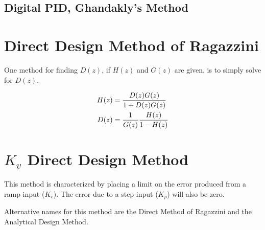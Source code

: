 \documentclass{article}
\newcommand{\sincludepdf}[2][]{
	
}
\begin{document}
\sincludepdf[pages={10},
			pagecommand=\subsubsection*{Example 2}
	]{scan/11211301.pdf}

\sincludepdf[pages={8},
			pagecommand=\subsubsection*{Example 3}
		]{scan/11221301.pdf}

\sincludepdf[pages={9},
			pagecommand=\subsubsection*{Example 4}
		]{scan/11221301.pdf}

\subsection{Digital PID, Ghandakly's Method}


\section{Direct Design Method of Ragazzini}

One method for finding $D(z)$, if $H(z)$ and $G(z)$ are given,
is to simply solve for $D(z)$\autocite[Pg. 265]{franklin1998digital}.

\begin{align}
	H(z) &= \frac{D(z)G(z)}{1 + D(z)G(z)} \notag \\
	D(z) &= \frac{1}{G(z)} \frac{H(z)}{1 - H(z)}
\end{align}


\section{$K_v$ Direct Design Method}

This method is characterized by placing a limit on the error
produced from a ramp input ($K_v$).
The error due to a step input ($K_p$) will also be zero.

Alternative names for this method are the Direct Method
of Ragazzini\autocite[Pg. 264]{franklin1998digital} and
the Analytical Design Method\autocite[Pg. 242]{ogata1995discrete}.
\end{document}
